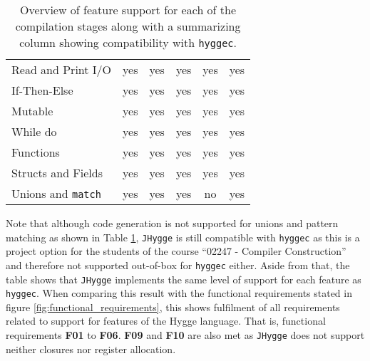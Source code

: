 \begin{table}[H]
\begin{tabular}{lccccc}
Read and Print I/O           & yes                                & yes                              & yes                                & yes                                & yes                                                              \\
If-Then-Else                 & yes                                & yes                              & yes                                & yes                                & yes                                                              \\
Mutable                      & yes                                & yes                              & yes                                & yes                                & yes                                                              \\
While do                     & yes                                & yes                              & yes                                & yes                                & yes                                                              \\
Functions                    & yes                                & yes                              & yes                                & yes                                & yes                                                              \\  
Structs and Fields & yes                                & yes                              & yes                                & yes           & yes                                         \\ 
Unions and \texttt{match}  & yes                                & yes                              & yes                                & no                                 & yes                                                             
\end{tabular}
\caption{Overview of feature support for each of the compilation stages along with a summarizing column showing compatibility with \texttt{hyggec}.}
\label{table:requirements_fulfillment}
\end{table}

Note that although code generation is not supported for unions and pattern matching as shown in Table \ref{table:requirements_fulfillment}, \texttt{JHygge} is still compatible with \texttt{hyggec}
as this is a project option for the students of the course ``02247 - Compiler Construction'' and therefore not supported out-of-box for \texttt{hyggec}
either. Aside from that, the table shows that \texttt{JHygge} implements the same level of support for each feature as \texttt{hyggec}.
When comparing this result with the functional requirements stated in figure \ref{fig:functional_requirements}, this shows fulfilment of all requirements related to support for features of the Hygge language. That is, functional requirements \textbf{F01} to \textbf{F06}. \textbf{F09} and \textbf{F10} are also met as \texttt{JHygge}
does not support neither closures nor register allocation.


